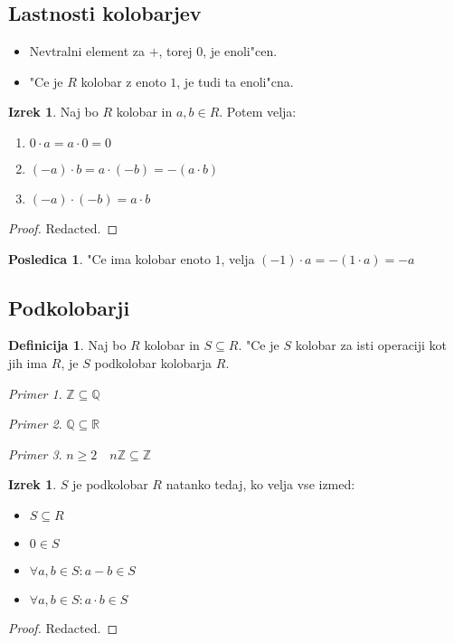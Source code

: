 \documentclass[11pt, a4paper]{article}
\theoremstyle{definition}
\newtheorem{defn}[counter]{Definicija}
\newtheorem{conseq}[counter]{Posledica}
\newtheorem{theorem}[counter]{Izrek}
\theoremstyle{remark}
\newtheorem*{ex}{Primer}
\newcommand{\Z}{\mathbb{Z}}
\newcommand{\Q}{\mathbb{Q}}
\newcommand{\R}{\mathbb{R}}
\begin{document}
	\subsection{Lastnosti kolobarjev}	
	\begin{itemize}
		\item Nevtralni element za $+$, torej $0$, je enoli"cen.
		\item "Ce je $R$ kolobar z enoto $1$, je tudi ta enoli"cna.
	\end{itemize}
	\begin{theorem}
		Naj bo $R$ kolobar in $a,b \in R$. Potem velja:
		\begin{enumerate}
			\item $0 \cdot a = a \cdot 0 = 0$
			\item $(-a) \cdot b = a \cdot (-b) = -(a \cdot b)$
			\item $(-a) \cdot (-b) = a \cdot b$
		\end{enumerate}
	\end{theorem}
	\begin{proof}
		Redacted.
	\end{proof}

	\begin{conseq}
		"Ce ima kolobar enoto $1$, velja $(-1) \cdot a = -(1 \cdot a) = -a$
	\end{conseq}

	\subsection{Podkolobarji}
	\begin{defn}
		Naj bo $R$ kolobar in $S \subseteq R$. "Ce je $S$ kolobar za isti operaciji kot jih ima $R$, je $S$ podkolobar kolobarja $R$.
	\end{defn}
	\begin{ex}
		$\Z \subseteq \Q$
	\end{ex}
	\begin{ex}
		$\Q \subseteq \R$
	\end{ex}
	\begin{ex}
		$n \geq 2 \quad n\Z \subseteq \Z$
	\end{ex}

	\begin{theorem}\label{podkolobar}
		$S$ je podkolobar $R$ natanko tedaj, ko velja vse izmed:
		\begin{itemize}
			\item $S \subseteq R$
			\item $0 \in S$
			\item $\forall a,b \in S: a-b \in S$
			\item $\forall a,b \in S: a \cdot b \in S$
		\end{itemize}
	\end{theorem}
	\begin{proof}
		Redacted.
	\end{proof}
\end{document}
